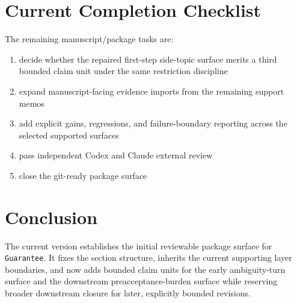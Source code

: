 \documentclass[11pt]{article}
\begin{document}
\section{Current Completion Checklist}

The remaining manuscript/package tasks are:
\begin{enumerate}
\item decide whether the repaired first-step side-topic surface merits a third
bounded claim unit under the same restriction discipline
\item expand manuscript-facing evidence imports from the remaining support memos
\item add explicit gains, regressions, and failure-boundary reporting across the
selected supported surfaces
\item pass independent Codex and Claude external review
\item close the git-ready package surface
\end{enumerate}

\section{Conclusion}

The current version establishes the initial reviewable package surface for
\texttt{Guarantee}. It fixes the section structure, inherits the current supporting
layer boundaries, and now adds bounded claim units for the early ambiguity-turn
surface and the downstream preacceptance-burden surface while reserving broader
downstream closure for later, explicitly bounded revisions.
\end{document}
